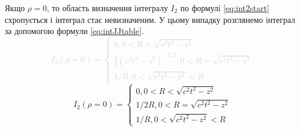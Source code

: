 Якщо $ \rho = 0 $, то область визначення інтегралу $ I_2 $ по формулі 
\eqref{eq:int2start} схропується і інтеграл стає невизначеним. У цьому випадку 
розглянемо інтеграл за допомогою формули \eqref{eq:intJJtable}.
%
\textcolor{lightgray}{ \begin{equation*}
I_2 \left( \rho = 0 \right) = \begin{cases}
0, 0 < R < \sqrt{c^2t^2 - z^2} \\
\frac{1}{2} \left( c^2t^2 - z^2 \right)^{-1/2}, 0 < R = \sqrt{c^2t^2 - z^2} \\ 
1/R, 0 < \sqrt{c^2t^2 - z^2} < R 
\end{cases}
\end{equation*} }
%
\begin{equation}
I_2 \left( \rho = 0 \right) = \begin{cases}
0, 0 < R < \sqrt{c^2t^2 - z^2} \\
1/2R, 0 < R = \sqrt{c^2t^2 - z^2} \\ 
1/R, 0 < \sqrt{c^2t^2 - z^2} < R 
\end{cases}
\end{equation}
